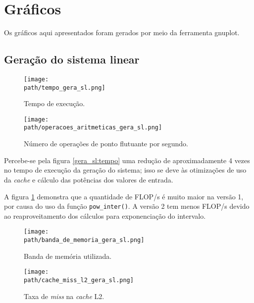 \documentclass[a4paper, 11pt]{article}
\begin{document}
\section{Gráficos}
Os gráficos aqui apresentados foram gerados por meio da ferramenta gnuplot.
\def\path{../resultados/graficos}

\renewcommand{\thefigure}{\arabic{subsection}.\arabic{figure}}

\subsection{Geração do sistema linear}
\label{subsecao:gera_sl}
\begin{figure}[H]
    \centering
    \begin{minipage}{.5\textwidth}
        \centering
        \texttt{[image: \\path/tempo\_gera\_sl.png]}
        \caption{Tempo de execução.}
        \label{gera_sl:tempo}
    \end{minipage}\hfill
    \begin{minipage}{.5\textwidth}
        \centering
        \texttt{[image: \\path/operacoes\_aritmeticas\_gera\_sl.png]}
        \caption{Número de operações de ponto flutuante por segundo.}
        \label{gera_sl:flops}
    \end{minipage}
\end{figure}

Percebe-se pela figura \ref{gera_sl:tempo} uma redução de aproximadamente 4 vezes
no tempo de execução da geração do sistema; isso se deve às otimizações de uso da
\textit{cache} e cálculo das potências dos valores de entrada.

A figura \ref{gera_sl:flops} demonstra que a quantidade de FLOP/s é muito
maior na versão 1, por causa do uso da função \texttt{pow\_inter()}. A versão
2 tem menos FLOP/s devido ao reaproveitamento dos cálculos para exponenciação
do intervalo.

\begin{figure}[H]
    \centering
    \begin{minipage}{.5\textwidth}
        \centering
        \texttt{[image: \\path/banda\_de\_memoria\_gera\_sl.png]}
        \caption{Banda de memória utilizada.}
        \label{gera_sl:banda}
    \end{minipage}\hfill
    \begin{minipage}{.5\textwidth}
        \centering
        \texttt{[image: \\path/cache\_miss\_l2\_gera\_sl.png]}
        \caption{Taxa de \textit{miss} na \textit{cache} L2.}
        \label{gera_sl:cache_miss}
    \end{minipage}
\end{figure}
\end{document}
